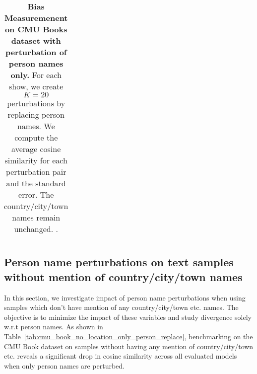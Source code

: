 \begin{table}[h!]
{\begin{tabular}{ll}
\bottomrule
\end{tabular}}
\caption{\textbf{Bias Measuremenent on CMU Books dataset with perturbation of person names only.} For each show, we create $K{=}20$ perturbations by
replacing person names. We compute the average cosine similarity for each perturbation pair and the standard error. The country/city/town names remain unchanged. \label{tab:cmu_book_only_person_replace}.}
\end{table}


\subsection{Person name perturbations on text samples without mention of country/city/town names}
\label{sec:person_name_no_country_samples}
In this section, we investigate impact of person name perturbations when using samples which don't have mention of any country/city/town etc. names. The objective is to minimize the impact of these variables and study divergence solely w.r.t person names. As shown in Table~\ref{tab:cmu_book_no_location_only_person_replace}, benchmarking on the CMU Book dataset on samples without having any mention of country/city/town etc. reveals a significant drop in cosine similarity across all evaluated models when only person names are perturbed.  


